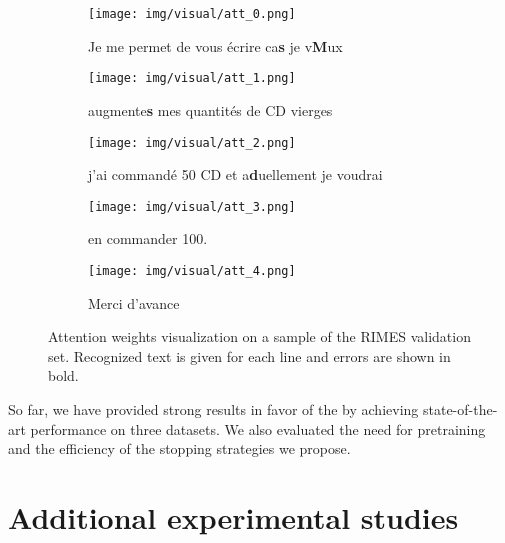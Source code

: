 \begin{figure}[h!]
\centering
    \begin{subfigure}[t]{0.35\textwidth}
    \texttt{[image: img/visual/att\_0.png]}    
    \caption*{Je me permet  de vous écrire ca\textbf{s} je v\textbf{M}ux}
    \end{subfigure}

    \begin{subfigure}[t]{0.35\textwidth}
    \texttt{[image: img/visual/att\_1.png]}    
     \caption*{augmente\textbf{s} mes quantités de CD vierges}
    \end{subfigure}
    
    \par\bigskip

    \begin{subfigure}[t]{0.35\textwidth}
    \texttt{[image: img/visual/att\_2.png]}   
     \caption*{j'ai commandé 50 CD et a\textbf{d}uellement je voudrai}
    \end{subfigure}

    \begin{subfigure}[t]{0.35\textwidth}
    \texttt{[image: img/visual/att\_3.png]}   
     \caption*{en commander 100.}
    \end{subfigure}
    
    \par\bigskip
    
    \begin{subfigure}[t]{0.35\textwidth}
    \texttt{[image: img/visual/att\_4.png]}   
    \caption*{Merci d'avance}
    \end{subfigure}
    
    
   
    \caption{Attention weights visualization on a sample of the RIMES validation set. Recognized text is given for each line and errors are shown in bold.}
    \label{fig:viz-rimes}
\end{figure}

So far, we have provided strong results in favor of the \modelname{} by achieving state-of-the-art performance on three datasets. We also evaluated the need for pretraining and the efficiency of the stopping strategies we propose. 


\section{Additional experimental studies}
\label{section-additional-exp}

